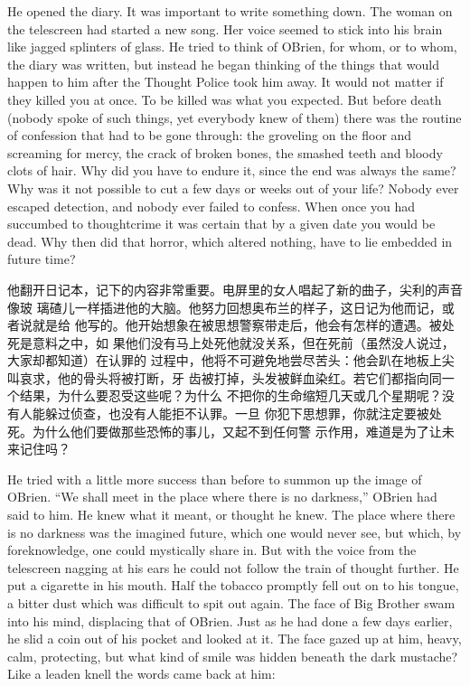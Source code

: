 \begin{paracol}{2}
He opened the diary. It was important to write something down. The woman
on the telescreen had started a new song. Her voice seemed to stick into
his brain like jagged splinters of glass. He tried to think of
O\textquotesingle Brien, for whom, or to whom, the diary was written,
but instead he began thinking of the things that would happen to him
after the Thought Police took him away. It would not matter if they
killed you at once. To be killed was what you expected. But before death
(nobody spoke of such things, yet everybody knew of them) there was the
routine of confession that had to be gone through: the groveling on the
floor and screaming for mercy, the crack of broken bones, the smashed
teeth and bloody clots of hair. Why did you have to endure it, since the
end was always the same? Why was it not possible to cut a few days or
weeks out of your life? Nobody ever escaped detection, and nobody ever
failed to confess. When once you had succumbed to thoughtcrime it was
certain that by a given date you would be dead. Why then did that
horror, which altered nothing, have to lie embedded in future time?

\switchcolumn

他翻开日记本，记下的内容非常重要。电屏里的女人唱起了新的曲子，尖利的声音像玻
璃碴儿一样插进他的大脑。他努力回想奥布兰的样子，这日记为他而记，或者说就是给
他写的。他开始想象在被思想警察带走后，他会有怎样的遭遇。被处死是意料之中，如
果他们没有马上处死他就没关系，但在死前（虽然没人说过，大家却都知道）在认罪的
过程中，他将不可避免地尝尽苦头：他会趴在地板上尖叫哀求，他的骨头将被打断，牙
齿被打掉，头发被鲜血染红。若它们都指向同一个结果，为什么要忍受这些呢？为什么
不把你的生命缩短几天或几个星期呢？没有人能躲过侦查，也没有人能拒不认罪。一旦
你犯下思想罪，你就注定要被处死。为什么他们要做那些恐怖的事儿，又起不到任何警
示作用，难道是为了让未来记住吗？

\switchcolumn*

He tried with a little more success than before to summon up the image
of O\textquotesingle Brien. ``We shall meet in the place where there is
no darkness,'' O\textquotesingle Brien had said to him. He knew what it
meant, or thought he knew. The place where there is no darkness was the
imagined future, which one would never see, but which, by foreknowledge,
one could mystically share in. But with the voice from the telescreen
nagging at his ears he could not follow the train of thought further. He
put a cigarette in his mouth. Half the tobacco promptly fell out on to
his tongue, a bitter dust which was difficult to spit out again. The
face of Big Brother swam into his mind, displacing that of
O\textquotesingle Brien. Just as he had done a few days earlier, he slid
a coin out of his pocket and looked at it. The face gazed up at him,
heavy, calm, protecting, but what kind of smile was hidden beneath the
dark mustache? Like a leaden knell the words came back at him:


\end{paracol}
